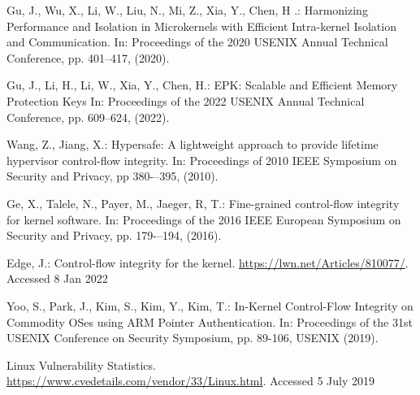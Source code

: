 \documentclass[english,sigrecommended,JIP]{ipsj}
\begin{document}
\begin{thebibliography}{99}
  Gu, J., Wu, X., Li, W., Liu, N., Mi, Z., Xia, Y., Chen, H
  .: Harmonizing Performance and Isolation in Microkernels with Efficient Intra-kernel Isolation and Communication.
  In: Proceedings of the 2020 USENIX Annual Technical Conference, pp. 401--417, (2020).
  
  Gu, J., Li, H., Li, W., Xia, Y., Chen, H.: EPK: Scalable and Efficient Memory Protection Keys
  In: Proceedings of the 2022 USENIX Annual Technical Conference, pp. 609--624, (2022).
  
  Wang, Z., Jiang, X.: Hypersafe: A lightweight approach to provide lifetime hypervisor control-flow integrity. 
  In: Proceedings of 2010 IEEE Symposium on Security and Privacy, pp 380-–395, (2010).

  Ge, X., Talele, N., Payer, M., Jaeger, R, T.: Fine-grained control-flow integrity for kernel software. 
  In: Proceedings of the 2016 IEEE European Symposium on Security and Privacy, pp. 179-–194, (2016).

  Edge, J.: Control-flow integrity for the kernel. \url{https://lwn.net/Articles/810077/}.  Accessed 8 Jan 2022

  Yoo, S., Park, J., Kim, S., Kim, Y., Kim, T.: In-Kernel Control-Flow Integrity on Commodity OSes using ARM Pointer Authentication.
  In: Proceedings of the 31st USENIX Conference on Security Symposium, pp. 89-106, USENIX (2019). 

  Linux Vulnerability Statistics. \url{https://www.cvedetails.com/vendor/33/Linux.html}. Accessed 5 July 2019

  
\end{thebibliography}



\end{document}
